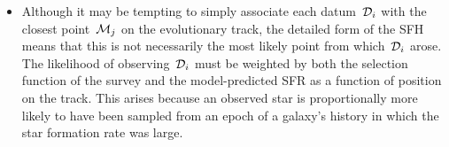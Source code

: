 \documentclass[ms.tex]{subfiles}
\begin{document}
\begin{itemize}
\begin{itemize}
		\item Although it may be tempting to simply associate each
		datum~$\mathcal{D}_i$ with the closest point~$\mathcal{M}_j$ on the
		evolutionary track, the detailed form of the SFH means that this is not
		necessarily the most likely point from which~$\mathcal{D}_i$ arose.
		The likelihood of observing~$\mathcal{D}_i$ must be weighted by both the
		selection function of the survey and the model-predicted SFR as a
		function of position on the track.
		This arises because an observed star is proportionally more likely to
		have been sampled from an epoch of a galaxy's history in which the star
		formation rate was large.
	\end{itemize}

\end{itemize}
\end{document}
